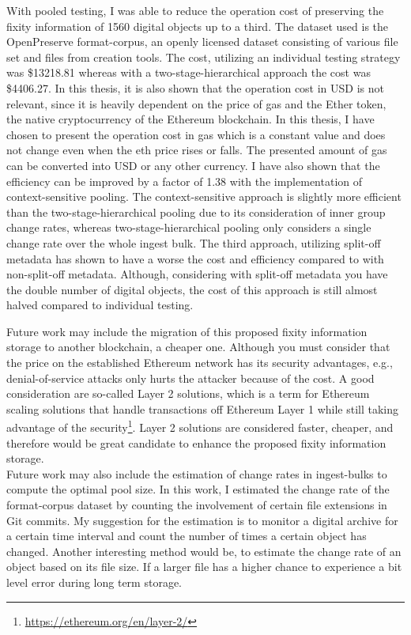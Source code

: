 \documentclass[final]{vutinfth}
\begin{document}
With pooled testing, I was able to reduce the operation cost of preserving the fixity information of 1560 digital objects up to a third. The dataset used is the OpenPreserve format-corpus, an openly licensed dataset consisting of various file set and files from creation tools. The cost, utilizing an individual testing strategy was \$13218.81 whereas with a two-stage-hierarchical approach the cost was \$4406.27. In this thesis, it is also shown that the operation cost in USD is not relevant, since it is heavily dependent on the price of gas and the Ether token, the native cryptocurrency of the Ethereum blockchain. In this thesis, I have chosen to present the operation cost in gas which is a constant value and does not change even when the \acrlong{eth} price rises or falls. The presented amount of gas can be converted into USD or any other currency. I have also shown that the efficiency can be improved by a factor of 1.38 with the implementation of context-sensitive pooling. The context-sensitive approach is slightly more efficient than the two-stage-hierarchical pooling due to its consideration of inner group change rates, whereas two-stage-hierarchical pooling only considers a single change rate over the whole ingest bulk.
The third approach, utilizing split-off metadata has shown to have a worse the cost and efficiency compared to with non-split-off metadata. Although, considering with split-off metadata you have the double number of digital objects, the cost of this approach is still almost halved compared to individual testing.

Future work may include the migration of this proposed fixity information storage to another blockchain, a cheaper one. Although you must consider that the price on the established Ethereum network has its security advantages, e.g., denial-of-service attacks only hurts the attacker because of the cost. A good consideration are so-called Layer 2 solutions, which is a term for Ethereum scaling solutions that handle transactions off Ethereum Layer 1 while still taking advantage of the security\footnote{\url{https://ethereum.org/en/layer-2/}}. Layer 2 solutions are considered faster, cheaper, and therefore would be great candidate to enhance the proposed fixity information storage.\\
Future work may also include the estimation of change rates in ingest-bulks to compute the optimal pool size. In this work, I estimated the change rate of the format-corpus dataset by counting the involvement of certain file extensions in Git commits. My suggestion for the estimation is to monitor a digital archive for a certain time interval and count the number of times a certain object has changed. Another interesting method would be, to estimate the change rate of an object based on its file size. If a larger file has a higher chance to experience a bit level error during long term storage.
\end{document}
